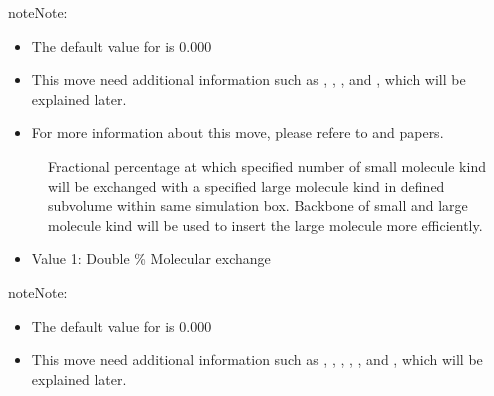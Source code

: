 \documentclass[letterpaper,10pt,english]{sphinxmanual}
\begin{document}
\begin{description}
\begin{itemize}
\end{itemize}

\begin{sphinxadmonition}{note}{Note:}\begin{itemize}
\item {} 
\sphinxAtStartPar
The default value for  is 0.000

\item {} 
\sphinxAtStartPar
This move need additional information such as , , , and , which will be explained later.

\item {} 
\sphinxAtStartPar
For more information about this move, please refere to  and  papers.

\end{itemize}
\end{sphinxadmonition}
\begin{description}
\item[{}] \leavevmode
\sphinxAtStartPar
Fractional percentage at which specified number of small molecule kind will be exchanged with a specified large molecule kind in defined sub\sphinxhyphen{}volume within same simulation box. Backbone of small and large molecule kind will be used to insert the large molecule more efficiently.

\end{description}
\begin{itemize}
\item {} 
\sphinxAtStartPar
Value 1: Double \sphinxhyphen{} \% Molecular exchange

\end{itemize}

\begin{sphinxadmonition}{note}{Note:}\begin{itemize}
\item {} 
\sphinxAtStartPar
The default value for  is 0.000

\item {} 
\sphinxAtStartPar
This move need additional information such as , , , , , and , which will be explained later.


\end{itemize}
\end{sphinxadmonition}
\end{description}
\end{document}
